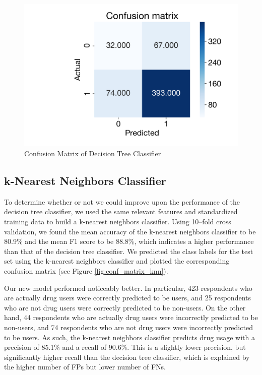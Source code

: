 \documentclass[10pt]{article}
\begin{document}
\begin{figure}[H]
\caption{Confusion Matrix of Decision Tree Classifier}
\label{fig:conf_matrix_dt}
\centering
\includegraphics[scale=0.4]{conf_matrix_dt.png}
\end{figure}

\subsection*{k-Nearest Neighbors Classifier}

To determine whether or not we could improve upon the performance of the decision tree classifier, we used the same relevant features and standardized training data to build a k-nearest neighbors classifier. Using 10–fold cross validation, we found the mean accuracy of the k-nearest neighbors classifier to be 80.9\% and the mean F1 score to be 88.8\%, which indicates a higher performance than that of the decision tree classifier. We predicted the class labels for the test set using the k-nearest neighbors classifier and plotted the corresponding confusion matrix (see Figure \ref{fig:conf_matrix_knn}).

Our new model performed noticeably better. In particular, 423 respondents who are actually drug users were correctly predicted to be users, and 25 respondents who are not drug users were correctly predicted to be non-users. On the other hand, 44 respondents who are actually drug users were incorrectly predicted to be non-users, and 74 respondents who are not drug users were incorrectly predicted to be users. As such, the k-nearest neighbors classifier predicts drug usage with a precision of 85.1\% and a recall of 90.6\%. This is a slightly lower precision, but significantly higher recall than the decision tree classifier, which is explained by the higher number of FPs but lower number of FNs.
\end{document}
